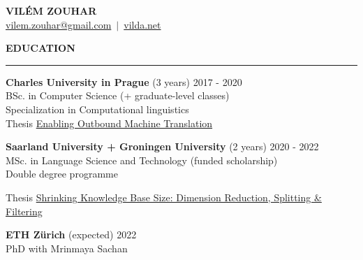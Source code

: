 \documentclass[11pt,a4paper]{article} %
\newcommand{\hSection}[1]{
    \medskip
    \MakeUppercase{\bf #1}
    \medskip
    \hrule
}
\begin{document}
\begin{center}
    {\LARGE \bf VILÉM ZOUHAR} \\
    {\large
        \href{mailto:vilem.zouhar@gmail.com}{\color{black} vilem.zouhar@gmail.com}
        \,$|$\,
        \href{https://vilda.net/}{\color{black} vilda.net}
    }
\end{center}

\vspace{\baselineskip}

\begin{minipage}{1\textwidth}
\hSection{Education}\vspace{0.2cm}
{\bf Charles University in Prague} \hfill {(3 years) 2017 - 2020} \\
BSc. in Computer Science (+ graduate-level classes)\\
Specialization in Computational linguistics \\
Thesis \href{https://dspace.cuni.cz/bitstream/handle/20.500.11956/119400/130284419.pdf?sequence=1&isAllowed=y}{Enabling Outbound Machine Translation}

\vspace{\baselineskip}

{\bf Saarland University\hspace{-0.1cm} +\hspace{-0.1cm} Groningen University} \hfill {(2 years) 2020 - 2022} \\
MSc. in Language Science and Technology (funded scholarship) \\
Double degree programme \\
\begin{minipage}{1.25\textwidth}
Thesis \href{https://raw.githubusercontent.com/zouharvi/kb-shrink/main/meta/thesis/zouhar_thesis_lct.pdf}{Shrinking Knowledge Base Size: Dimension Reduction, Splitting \& Filtering}
\end{minipage}

\vspace{\baselineskip}

{\bf ETH Zürich} \hfill {(expected) 2022} \\
PhD with Mrinmaya Sachan
\end{minipage}


\end{document}
